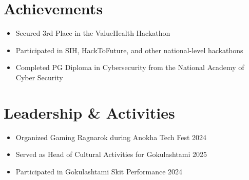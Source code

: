 \documentclass[letterpaper,10pt]{article}
\begin{document}
\section{Achievements}
\begin{itemize}

\item \small{Secured 3rd Place in the ValueHealth Hackathon}

\item \small{Participated in SIH, HackToFuture, and other national-level hackathons}

\item \small{Completed PG Diploma in Cybersecurity from the National Academy of Cyber Security}

\end{itemize}

\section{Leadership \& Activities}
\begin{itemize}

\item \small{Organized Gaming Ragnarok during Anokha Tech Fest 2024}

\item \small{Served as Head of Cultural Activities for Gokulashtami 2025}

\item \small{Participated in Gokulashtami Skit Performance 2024}

\end{itemize}
\end{document}

